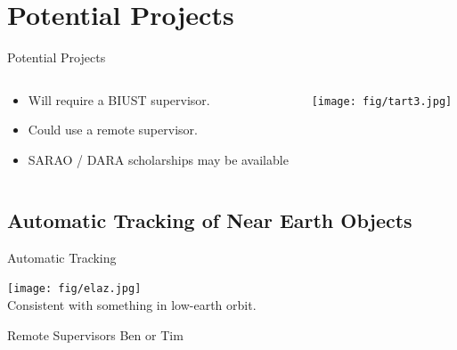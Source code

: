 \documentclass[ignorenonframetext]{beamer}
\begin{document}
\section{Potential Projects}


\begin{frame}{Potential Projects}
 \begin{columns}
  \begin{column}{0.6\linewidth}
    \begin{itemize}
    \item Will require a BIUST supervisor.
    \item Could use a remote supervisor.
    \item SARAO / DARA scholarships may be available
    \end{itemize}
  \end{column}
  \begin{column}{0.4\linewidth}
    \texttt{[image: fig/tart3.jpg]}
  \end{column}
\end{columns}
\end{frame}



\subsection{Automatic Tracking of Near Earth Objects}
\begin{frame}{Automatic Tracking}
\begin{center}
\texttt{[image: fig/elaz.jpg]}\\
 Consistent with something in low-earth orbit.
 \end{center}
  \begin{block}{Remote Supervisors}
 Ben or Tim
 \end{block}

\end{frame}
\end{document}
